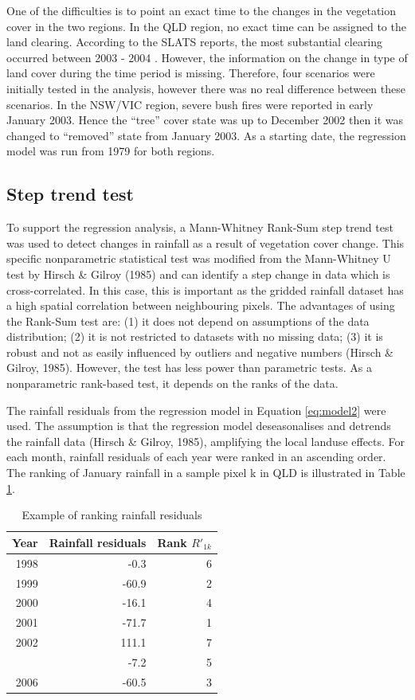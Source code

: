 \documentclass[fleqn,10pt,lineno]{wlpeerj} %
\theoremstyle{definition}
\theoremstyle{definition}
\theoremstyle{definition}
\theoremstyle{remark}
\begin{document}
One of the difficulties is to point an exact time to the changes in the
vegetation cover in the two regions. In the QLD region, no exact time
can be assigned to the land clearing. According to the SLATS reports,
the most substantial clearing occurred between 2003 - 2004 . However,
the information on the change in type of land cover during the time
period is missing. Therefore, four scenarios were initially tested in
the analysis, however there was no real difference between these
scenarios. In the NSW/VIC region, severe bush fires were reported in
early January 2003. Hence the ``tree'' cover state was up to December
2002 then it was changed to ``removed'' state from January 2003. As a
starting date, the regression model was run from 1979 for both regions.

\subsection{Step trend test}\label{step-trend-test}

To support the regression analysis, a Mann-Whitney Rank-Sum step trend
test was used to detect changes in rainfall as a result of vegetation
cover change. This specific nonparametric statistical test was modified
from the Mann-Whitney U test by Hirsch \& Gilroy (1985) and can identify
a step change in data which is cross-correlated. In this case, this is
important as the gridded rainfall dataset has a high spatial correlation
between neighbouring pixels. The advantages of using the Rank-Sum test
are: (1) it does not depend on assumptions of the data distribution; (2)
it is not restricted to datasets with no missing data; (3) it is robust
and not as easily influenced by outliers and negative numbers (Hirsch \&
Gilroy, 1985). However, the test has less power than parametric tests.
As a nonparametric rank-based test, it depends on the ranks of the data.

The rainfall residuals from the regression model in Equation
\eqref{eq:model2} were used. The assumption is that the regression model
deseasonalises and detrends the rainfall data (Hirsch \& Gilroy, 1985),
amplifying the local landuse effects. For each month, rainfall residuals
of each year were ranked in an ascending order. The ranking of January
rainfall in a sample pixel k in QLD is illustrated in Table
\ref{tab:exampleRank}.

\begin{table}[t]

\caption{\label{tab:exampleRank}Example of ranking rainfall residuals}
\centering
\begin{tabular}{rrr}
\toprule
Year & Rainfall residuals & Rank $R'_{1k}$\\
\midrule
1998 & -0.3 & 6\\
1999 & -60.9 & 2\\
2000 & -16.1 & 4\\
2001 & -71.7 & 1\\
2002 & 111.1 & 7\\
\addlinespace
2005 & -7.2 & 5\\
2006 & -60.5 & 3\\
\bottomrule
\end{tabular}
\end{table}
\end{document}
